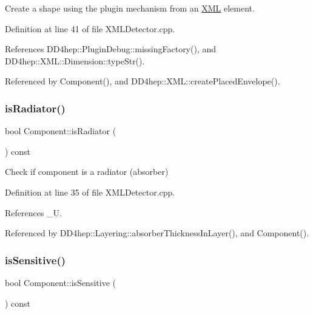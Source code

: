 Create a shape using the plugin mechanism from an \hyperlink{namespace_d_d4hep_1_1_x_m_l}{X\+ML} element. 



Definition at line 41 of file X\+M\+L\+Detector.\+cpp.



References D\+D4hep\+::\+Plugin\+Debug\+::missing\+Factory(), and D\+D4hep\+::\+X\+M\+L\+::\+Dimension\+::type\+Str().



Referenced by Component(), and D\+D4hep\+::\+X\+M\+L\+::create\+Placed\+Envelope().

\hypertarget{struct_d_d4hep_1_1_x_m_l_1_1_component_a8a674bba3a085443e7d9be736e73d040}{}\label{struct_d_d4hep_1_1_x_m_l_1_1_component_a8a674bba3a085443e7d9be736e73d040} 
\subsubsection{\texorpdfstring{is\+Radiator()}{isRadiator()}}
{\footnotesize\ttfamily bool Component\+::is\+Radiator (\begin{DoxyParamCaption}{ }\end{DoxyParamCaption}) const}



Check if component is a radiator (absorber) 



Definition at line 35 of file X\+M\+L\+Detector.\+cpp.



References \+\_\+U.



Referenced by D\+D4hep\+::\+Layering\+::absorber\+Thickness\+In\+Layer(), and Component().

\hypertarget{struct_d_d4hep_1_1_x_m_l_1_1_component_a075515092ea42a6ed41d3bb4a072de81}{}\label{struct_d_d4hep_1_1_x_m_l_1_1_component_a075515092ea42a6ed41d3bb4a072de81} 
\subsubsection{\texorpdfstring{is\+Sensitive()}{isSensitive()}}
{\footnotesize\ttfamily bool Component\+::is\+Sensitive (\begin{DoxyParamCaption}{ }\end{DoxyParamCaption}) const}



